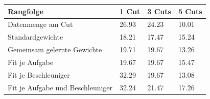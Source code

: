 \begin{tabular}{@{}llll@{}}
\toprule
Rangfolge & 1 Cut & 3 Cuts & 5 Cuts \\
\midrule
Datenmenge am Cut & 26.93 & 24.23 & 10.01 \\
Standardgewichte & 18.21 & 17.47 & 15.24 \\
Gemeinsam gelernte Gewichte & 19.71 & 19.67 & 13.26 \\
Fit je Aufgabe & 19.67 & 19.67 & 15.47 \\
Fit je Beschleuniger & 32.29 & 19.67 & 13.08 \\
Fit je Aufgabe und Beschleuniger & 32.24 & 21.47 & 17.26 \\
\bottomrule
\end{tabular}
